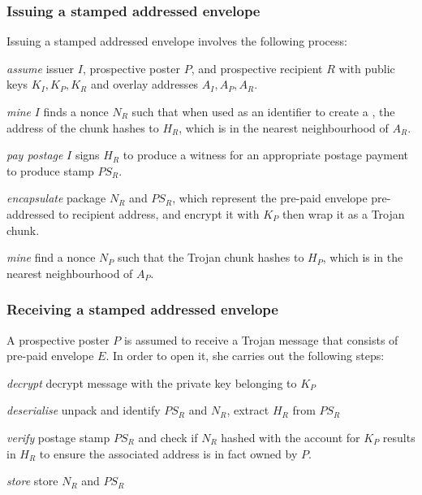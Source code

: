 \subsubsection{Issuing a stamped addressed envelope}

Issuing a stamped addressed envelope involves the following process:

\begin{labelledlist}
\item[\emph{assume}] issuer $I$, prospective poster $P$, and prospective recipient $R$ with public keys $K_I, K_P, K_R$ and overlay addresses $A_I, A_P, A_R$.
\item[\emph{mine}] $I$ finds a nonce $N_R$ such that when used as an identifier to create a , the  address of the chunk hashes to $H_R$, which is in the nearest neighbourhood of $A_R$.
\item[\emph{pay postage}] $I$ signs $H_R$ to produce a witness for an appropriate postage payment to produce stamp $PS_R$.
\item[\emph{encapsulate}] package $N_R$ and $PS_R$, which represent the pre-paid envelope pre-addressed to recipient address, and encrypt it with $K_P$ then wrap it as a Trojan chunk.
\item[\emph{mine}] find a nonce $N_P$ such that the Trojan chunk hashes to $H_P$, which is in the nearest neighbourhood of $A_P$. 
\end{labelledlist}




\subsubsection{Receiving a stamped addressed envelope}

A prospective poster $P$ is assumed to receive a Trojan message that consists of pre-paid envelope $E$. In order to open it, she carries out the following steps:

\begin{labelledlist}
    \item[\emph{decrypt}] decrypt message with the private key belonging to $K_P$
    \item[\emph{deserialise}] unpack and identify $PS_R$ and $N_R$, extract $H_R$ from $PS_R$
    \item[\emph{verify}] postage stamp $PS_R$ and check if $N_R$ hashed with the account for $K_P$ results in $H_R$ to ensure the associated address is in fact owned by $P$.
    \item[\emph{store}] store $N_R$ and $PS_R$ 
\end{labelledlist}

